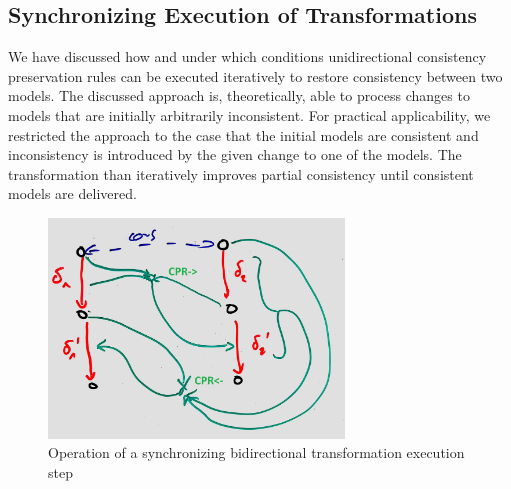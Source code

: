 


\subsection{Synchronizing Execution of Transformations}
\label{chap:synchronization:bidirectional:execution}

We have discussed how and under which conditions unidirectional consistency preservation rules can be executed iteratively to restore consistency between two models.
The discussed approach is, theoretically, able to process changes to models that are initially arbitrarily inconsistent.
For practical applicability, we restricted the approach to the case that the initial models are consistent and inconsistency is introduced by the given change to one of the models.
The transformation than iteratively improves partial consistency until consistent models are delivered.

\begin{figure}
    \centering
    \includegraphics[width=0.7\textwidth]{figures/correctness/synchronization/synchronizing_execution_step.jpg}    
    \caption[Synchronizing bidirectional transformation execution step]{Operation of a synchronizing bidirectional transformation execution step}
    \label{fig:synchronization:synchronizing_execution_step}
\end{figure}


